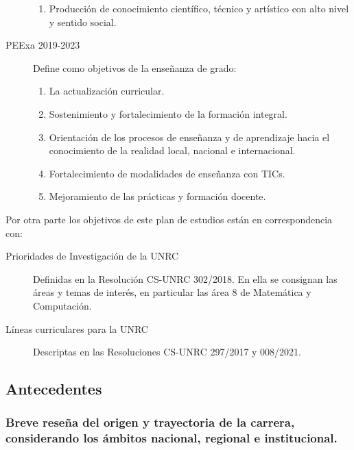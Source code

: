 \documentclass[a4paper, 12pt]{article}
\begin{document}
\begin{description}
\begin{enumerate}
 \item Producción  de  conocimiento  científico,  técnico y artístico con alto nivel y sentido social. 
\end{enumerate}

\item[PEExa 2019-2023] Define como objetivos de la enseñanza de grado:
\begin{enumerate}
 \item  La actualización curricular.
 \item Sostenimiento y fortalecimiento de la formación integral.
\item Orientación de los procesos de enseñanza y de aprendizaje hacia el
conocimiento de la realidad local, nacional e internacional.
\item Fortalecimiento de modalidades de enseñanza con TICs.
\item Mejoramiento de las prácticas y formación docente.

\end{enumerate}

\end{description}

Por otra parte los objetivos de este plan de estudios están en correspondencia con:

\begin{description}
\item[Prioridades de Investigación de la UNRC] Definidas en la Resolución CS-UNRC 302/2018. 
En ella se consignan las áreas y temas de interés, en particular las área 8 de Matemática y Computación.
\item[Líneas curriculares para la UNRC] Descriptas en las Resoluciones CS-UNRC 297/2017 y 008/2021.
\end{description}




\subsection{Antecedentes}

\subsubsection{Breve reseña del origen y trayectoria de la carrera, considerando los ámbitos nacional, regional e institucional.}
\end{document}

